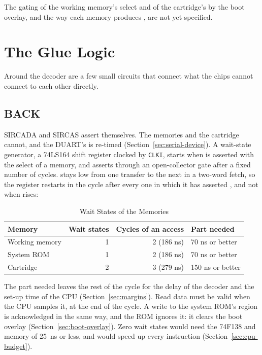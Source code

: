 \noindent The gating of the working memory's select and of the cartridge's by the boot overlay, and the way each memory
produces , are not yet specified.

\section{The Glue Logic}
\label{sec:glue}

Around the decoder are a few small circuits that connect what the chips cannot connect to each other directly.

\subsection{BACK}

SIRCADA and SIRCAS assert  themselves. The memories and the cartridge cannot, and the DUART's
 is re-timed (Section~\ref{sec:serial-device}). A wait-state generator, a 74LS164 shift register
clocked by \texttt{CLKI}, starts when  is asserted with the select of a memory, and asserts
 through an open-collector gate after a fixed number of cycles.  stays low from one
transfer to the next in a two-word fetch, so the register restarts in the cycle after every one in which it has
asserted , and not when  rises:

\begin{table}[H]
	\centering
	\begin{tabular}{lrrl}
		\toprule
		\textbf{Memory} & \textbf{Wait states} & \textbf{Cycles of an access} & \textbf{Part needed} \\
		\midrule
		Working memory  & 1                    & 2 (186 ns)                   & 70 ns or better      \\
		System ROM      & 1                    & 2 (186 ns)                   & 70 ns or better      \\
		Cartridge       & 2                    & 3 (279 ns)                   & 150 ns or better     \\
		\bottomrule
	\end{tabular}
	\caption{Wait States of the Memories}
	\label{tab:wait-states}
\end{table}

\noindent The part needed leaves the rest of the cycle for the delay of the decoder and the set-up time of the CPU (Section~\ref{sec:margins}). Read data
must be valid when the CPU samples it, at the end of the cycle. A write to the system ROM's region is acknowledged in the same
way, and the ROM ignores it: it clears the boot overlay (Section~\ref{sec:boot-overlay}). Zero wait states would need the
74F138 and memory of 25~ns or less, and would speed up every instruction (Section~\ref{sec:cpu-budget}).

